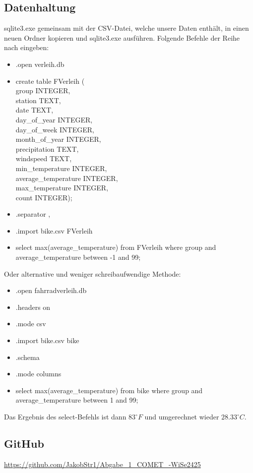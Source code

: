 \documentclass{article}
\begin{document}
\subsection{Datenhaltung}
sqlite3.exe gemeinsam mit der CSV-Datei, welche unsere Daten enthält, in einen neuen Ordner kopieren und  sqlite3.exe ausführen. Folgende Befehle der Reihe nach eingeben:
\begin{itemize}
    \item .open verleih.db
    \item create table FVerleih (\\ \grqq group\grqq{} INTEGER, \\station TEXT, \\date TEXT, \\day\_of\_year INTEGER, \\day\_of\_week INTEGER, \\month\_of\_year INTEGER, \\precipitation TEXT, \\windspeed TEXT, \\min\_temperature INTEGER, \\average\_temperature INTEGER, \\max\_temperature INTEGER, \\count INTEGER);
    \item .separator ,
    \item .import bike.csv FVerleih
    \item select max(average\_temperature) from FVerleih where \grqq group and average\_temperature between -1 and 99;
\end{itemize} 
Oder alternative und weniger schreibaufwendige Methode:
\begin{itemize}
    \item .open fahrradverleih.db
    \item .headers on
    \item .mode csv
    \item .import bike.csv bike
    \item .schema
    \item .mode columns
    \item select max(average\_temperature) from bike where \grqq group and \\average\_temperature between 1 and 99;
\end{itemize}
Das Ergebnis des select-Befehls ist dann ${83}^\circ F$ und umgerechnet wieder ${28.33}^\circ C$.
\subsection{GitHub}
\url{https://github.com/JakobStr1/Abgabe_1_COMET_-WiSe2425}


\newpage
 

\end{document}
